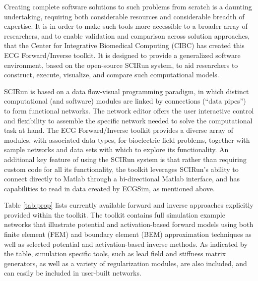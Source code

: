 \documentclass[fleqn,11pt,openany]{book}
\begin{document}
Creating complete software solutions to such problems from scratch is a
daunting undertaking, requiring both considerable resources and considerable
breadth of expertise. It is in order to make such tools more accessible to
a broader array of researchers, and to enable validation and comparison
across solution approaches, that the Center for Integrative Biomedical
Computing (CIBC) has created this ECG Forward/Inverse toolkit. It is
designed to provide a generalized software environment, based on the open-source
SCIRun system, to aid researchers to construct, execute, visualize,
and compare such computational models.

SCIRun is based on a data flow-visual programming paradigm, in which distinct
computational (and software) modules are linked by connections (``data
pipes'') to form functional networks. The network editor offers the user
interactive control and flexibility to assemble the specific network needed to
solve the computational task at hand.
The ECG Forward/Inverse toolkit provides
a diverse array of modules, with associated data types, for bioelectric field problems,
together with sample networks and data sets with which to explore its
functionality.
An additional key feature of using the SCIRun system is
that rather than requiring custom code for all its functionality, the
toolkit leverages SCIRun's ability to
connect directly to Matlab through a
bi-directional Matlab interface, and has capabilities to read in data
created by ECGSim, as mentioned above.

Table \ref{tab:prop} lists currently available forward and inverse
approaches explicitly provided within the toolkit. The toolkit contains
full simulation example networks that illustrate potential and
activation-based forward models using both finite element (FEM) and boundary
element (BEM) approximation techniques as well as selected potential and
activation-based inverse methods. As indicated by the table,
simulation specific tools, such as lead field and stiffness matrix
generators, as well as a variety of regularization modules, are also
included, and can easily be included in user-built networks.
\end{document}
